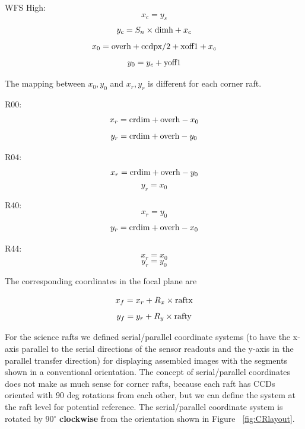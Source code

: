 \documentclass{article}[12pt]
\begin{document}
{WFS High:
\begin{equation}
x_c = y_s
\end{equation}
\begin{equation}
y_c = S_n \times {\rm dimh} + x_c
\end{equation}
\begin{equation}
x_0 = {\rm overh} + {\rm ccdpx}/2 + {\rm xoff1} + x_c
\end{equation}
\begin{equation}
y_0 = y_c + {\rm yoff1}
\end{equation}

The mapping between $x_0, y_0$ and $x_r, y_r$ is different for each corner raft.

R00:
\begin{equation}
x_r = {\rm crdim} + {\rm overh} - x_0
\end{equation}
\begin{equation}
y_r = {\rm crdim} + {\rm overh} - y_0
\end{equation}

R04:
\begin{equation}
x_r = {\rm crdim} + {\rm overh} - y_0
\end{equation}
\begin{equation}
y_r = x_0
\end{equation}

R40:
\begin{equation}
x_r = y_0
\end{equation}
\begin{equation}
y_r = {\rm crdim} + {\rm overh} - x_0
\end{equation}

R44:
\begin{equation}
x_r = x_0
\end{equation}
\begin{equation}
y_r = y_0
\end{equation}

The corresponding coordinates in the focal plane are 

\begin{equation}
x_f = x_r + R_x \times {\rm raftx}
\end{equation}
\begin{equation}
y_f = y_r + R_y \times {\rm rafty}
\end{equation}

For the science rafts we defined serial/parallel coordinate systems (to have the x-axis parallel to the serial directions of the sensor readouts and the y-axis in the parallel transfer direction) for displaying assembled images with the segments shown in a conventional orientation.  The concept of serial/parallel coordinates does not make as much sense for corner rafts, because each raft has CCDs oriented with 90 deg rotations from each other, but we can define the system at the raft level for potential reference.  The serial/parallel coordinate system is rotated by 90$^\circ$ {\bf clockwise} from the orientation shown in Figure ~\ref{fig:CRlayout}.

}
\end{document}
